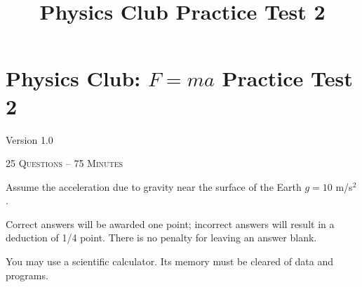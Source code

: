 \documentclass[12pt,letterpaper]{article}
\title{Physics Club Practice Test 2}
\begin{document}
\section*{Physics Club: $F=ma$ Practice Test 2}\hfill Version 1.0
\vspace{-2.5pt}
\begin{center}
\textsc{25 Questions -- 75 Minutes}
\end{center}
\vspace{-5pt}
Assume the acceleration due to gravity near the surface of the Earth $g = 10$ m/s$^2$.
\smallskip

Correct answers will be awarded one point; incorrect answers will result in a deduction of 1/4 point. There is no penalty for leaving an answer blank.
\smallskip

You may use a scientific calculator. Its memory must be cleared of data and programs.

\vspace{-5pt}
\hrulefill
\vspace{-10pt}
\end{document}
